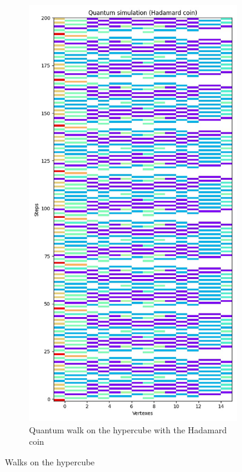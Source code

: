 \begin{figure}[H]
\begin{subfigure}{.45\linewidth}
  \end{subfigure}
  \begin{subfigure}{.45\linewidth}
    \centering
    \includegraphics[width=\linewidth]{./figures/results/hypercube/hadamard.jpg}
    \caption{Quantum walk on the hypercube with the Hadamard coin}
  \end{subfigure}
  \caption{Walks on the hypercube}
\end{figure}

